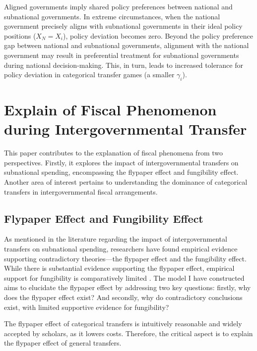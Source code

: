 \documentclass[man]{apa7}
\begin{document}
Aligned governments imply shared policy preferences between national and subnational governments. In extreme circumstances, when the national government precisely aligns with subnational governments in their ideal policy positions ($X_N = X_i$), policy deviation becomes zero. Beyond the policy preference gap between national and subnational governments, alignment with the national government may result in preferential treatment for subnational governments during national decision-making. This, in turn, leads to increased tolerance for policy deviation in categorical transfer games (a smaller $\gamma_i$). %


\section{Explain of Fiscal Phenomenon during Intergovernmental Transfer}

This paper contributes to the explanation of fiscal phenomena from two perspectives. Firstly, it explores the impact of intergovernmental transfers on subnational spending, encompassing the flypaper effect and fungibility effect. Another area of interest pertains to understanding the dominance of categorical transfers in intergovernmental fiscal arrangements.%

\subsection{Flypaper Effect and Fungibility Effect}


As mentioned in the literature regarding the impact of intergovernmental transfers on subnational spending, researchers have found empirical evidence supporting contradictory theories—the flypaper effect and the fungibility effect. While there is substantial evidence supporting the flypaper effect, empirical support for fungibility is comparatively limited \parencite{zampelli1986resource, khilji1991fungibility, khilji1994fungibility}. The model I have constructed aims to elucidate the flypaper effect by addressing two key questions: firstly, why does the flypaper effect exist? And secondly, why do contradictory conclusions exist, with limited supportive evidence for fungibility?%

The flypaper effect of categorical transfers is intuitively reasonable and widely accepted by scholars, as it lowers costs. Therefore, the critical aspect is to explain the flypaper effect of general transfers.%
\end{document}
